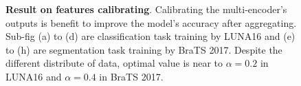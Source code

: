 \documentclass[journal]{IEEEtran}
\begin{document}
\begin{figure}
	\caption{\textbf{Result on features calibrating}. Calibrating the multi-encoder's outputs is benefit to improve the model's accuracy after aggregating. Sub-fig (a) to (d) are classification task training by LUNA16 and (e) to (h) are segmentation task training by BraTS 2017. Despite the different distribute of data, optimal value is near to $\alpha=0.2$ in LUNA16 and $\alpha=0.4$ in BraTS 2017.}
	\label{fig_alpha_result}
\end{figure}
\end{document}
